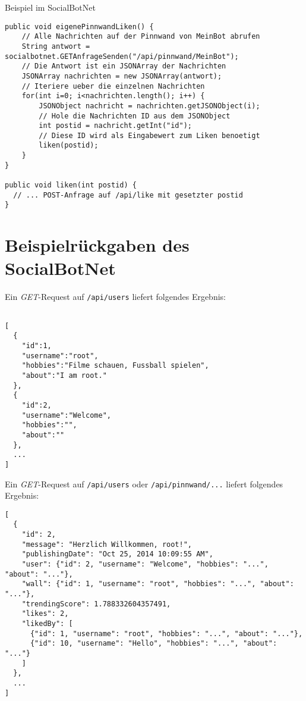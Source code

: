 \documentclass[parskip=half*]{scrartcl}
\begin{document}
Beispiel im SocialBotNet
\begin{lstlisting}
public void eigenePinnwandLiken() {
    // Alle Nachrichten auf der Pinnwand von MeinBot abrufen
    String antwort = socialbotnet.GETAnfrageSenden("/api/pinnwand/MeinBot");
    // Die Antwort ist ein JSONArray der Nachrichten
    JSONArray nachrichten = new JSONArray(antwort);
    // Iteriere ueber die einzelnen Nachrichten
    for(int i=0; i<nachrichten.length(); i++) {
        JSONObject nachricht = nachrichten.getJSONObject(i);
        // Hole die Nachrichten ID aus dem JSONObject
        int postid = nachricht.getInt("id");
        // Diese ID wird als Eingabewert zum Liken benoetigt
        liken(postid);
    }
}

public void liken(int postid) {
  // ... POST-Anfrage auf /api/like mit gesetzter postid
}
\end{lstlisting}

\newpage
\section*{Beispielrückgaben des SocialBotNet}

Ein \emph{GET}-Request auf \lstinline{/api/users} liefert folgendes Ergebnis:
\begin{lstlisting}

[
  {
    "id":1,
    "username":"root",
    "hobbies":"Filme schauen, Fussball spielen",
    "about":"I am root."
  },
  {
    "id":2,
    "username":"Welcome",
    "hobbies":"",
    "about":""
  },
  ...
]
\end{lstlisting}


Ein \emph{GET}-Request auf \lstinline{/api/users} oder \lstinline{/api/pinnwand/...} liefert folgendes Ergebnis:
\begin{lstlisting}
[
  {
    "id": 2,
    "message": "Herzlich Willkommen, root!",
    "publishingDate": "Oct 25, 2014 10:09:55 AM",
    "user": {"id": 2, "username": "Welcome", "hobbies": "...", "about": "..."},
    "wall": {"id": 1, "username": "root", "hobbies": "...", "about": "..."},
    "trendingScore": 1.788332604357491,
    "likes": 2,
    "likedBy": [
      {"id": 1, "username": "root", "hobbies": "...", "about": "..."},
      {"id": 10, "username": "Hello", "hobbies": "...", "about": "..."}
    ]
  },
  ...
]
\end{lstlisting}
\end{document}
